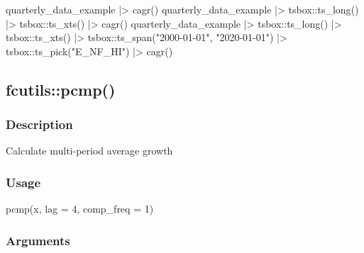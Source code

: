 \documentclass[
  letterpaper,
  DIV=11,
  numbers=noendperiod]{scrreport}
\newenvironment{Shaded}{\begin{snugshade}}{\end{snugshade}}
\newcommand{\AttributeTok}[1]{\textcolor[rgb]{0.40,0.45,0.13}{#1}}
\newcommand{\DecValTok}[1]{\textcolor[rgb]{0.68,0.00,0.00}{#1}}
\newcommand{\FunctionTok}[1]{\textcolor[rgb]{0.28,0.35,0.67}{#1}}
\newcommand{\NormalTok}[1]{\textcolor[rgb]{0.00,0.23,0.31}{#1}}
\newcommand{\SpecialCharTok}[1]{\textcolor[rgb]{0.37,0.37,0.37}{#1}}
\newcommand{\StringTok}[1]{\textcolor[rgb]{0.13,0.47,0.30}{#1}}
\begin{document}
\begin{Shaded}
\begin{Highlighting}[]
\NormalTok{quarterly\_data\_example }\SpecialCharTok{|\textgreater{}}
  \FunctionTok{cagr}\NormalTok{()}
\NormalTok{quarterly\_data\_example }\SpecialCharTok{|\textgreater{}}
\NormalTok{  tsbox}\SpecialCharTok{::}\FunctionTok{ts\_long}\NormalTok{() }\SpecialCharTok{|\textgreater{}}
\NormalTok{  tsbox}\SpecialCharTok{::}\FunctionTok{ts\_xts}\NormalTok{() }\SpecialCharTok{|\textgreater{}}
  \FunctionTok{cagr}\NormalTok{()}
\NormalTok{quarterly\_data\_example }\SpecialCharTok{|\textgreater{}}
\NormalTok{  tsbox}\SpecialCharTok{::}\FunctionTok{ts\_long}\NormalTok{() }\SpecialCharTok{|\textgreater{}}
\NormalTok{  tsbox}\SpecialCharTok{::}\FunctionTok{ts\_xts}\NormalTok{() }\SpecialCharTok{|\textgreater{}}
\NormalTok{  tsbox}\SpecialCharTok{::}\FunctionTok{ts\_span}\NormalTok{(}\StringTok{"2000{-}01{-}01"}\NormalTok{, }\StringTok{"2020{-}01{-}01"}\NormalTok{) }\SpecialCharTok{|\textgreater{}}
\NormalTok{  tsbox}\SpecialCharTok{::}\FunctionTok{ts\_pick}\NormalTok{(}\StringTok{"E\_NF\_HI"}\NormalTok{) }\SpecialCharTok{|\textgreater{}}
  \FunctionTok{cagr}\NormalTok{()}
\end{Highlighting}
\end{Shaded}

\subsection{fcutils::pcmp()}\label{fcutilspcmp}

\subsubsection{Description}\label{description-48}

Calculate multi-period average growth

\subsubsection{Usage}\label{usage-48}

\begin{Shaded}
\begin{Highlighting}[]
\FunctionTok{pcmp}\NormalTok{(x, }\AttributeTok{lag =} \DecValTok{4}\NormalTok{, }\AttributeTok{comp\_freq =} \DecValTok{1}\NormalTok{)}
\end{Highlighting}
\end{Shaded}

\subsubsection{Arguments}\label{arguments-48}
\end{document}
